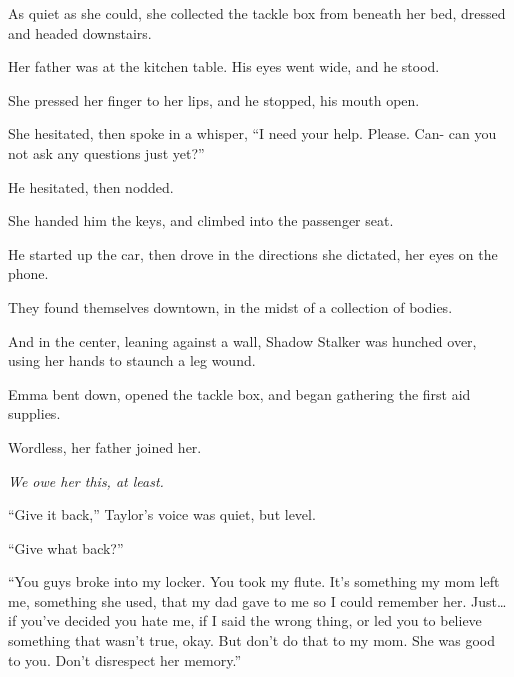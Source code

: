 As quiet as she could, she collected the tackle box from beneath her bed, dressed and headed downstairs.



Her father was at the kitchen table.  His eyes went wide, and he stood.



She pressed her finger to her lips, and he stopped, his mouth open.



She hesitated, then spoke in a whisper, ``I need your help.  Please.  Can- can you not ask any questions just yet?''



He hesitated, then nodded.



She handed him the keys, and climbed into the passenger seat.



He started up the car, then drove in the directions she dictated, her eyes on the phone.



They found themselves downtown, in the midst of a collection of bodies.



And in the center, leaning against a wall, Shadow Stalker was hunched over, using her hands to staunch a leg wound.



Emma bent down, opened the tackle box, and began gathering the first aid supplies.



Wordless, her father joined her.



\emph{We owe her this, at least.}



\sectionbreak



``Give it back,'' Taylor's voice was quiet, but level.



``Give what back?''



``You guys broke into my locker.  You took my flute.  It's something my mom left me, something she used, that my dad gave to me so I could remember her.  Just\ldots if you've decided you hate me, if I said the wrong thing, or led you to believe something that wasn't true, okay.  But don't do that to my mom.  She was good to you.  Don't disrespect her memory.''



